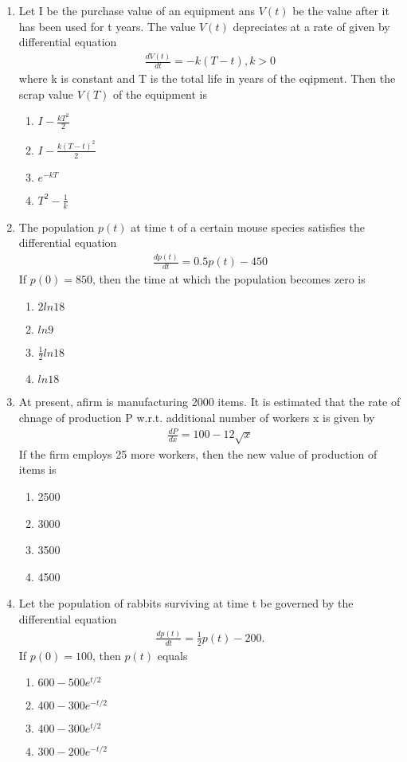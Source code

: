 \begin{enumerate}[label=\arabic*.,ref=\thesubsection.\theenumi]
\item Let I be the purchase value of an equipment ans $V(t)$ be the value after it has been used for t years. The value 
$V(t)$ depreciates at a rate of given by differential equation 
\begin{align*}
\frac{dV(t)}{dt} = -k(T - t), k > 0
\end{align*}
where k is constant and T is the total life in years of the eqipment. Then the scrap value $V(T)$ of the equipment is
\begin{enumerate}
\item $I - \frac{kT^2}{2}$
\item $I - \frac{k(T - t)^2}{2}$
\item $e^{-kT}$
\item $T^2 - \frac{1}{k}$
\end{enumerate} 

\item The population $p(t)$ at time t of a certain mouse species satisfies the differential equation
\begin{align*}
\frac{dp(t)}{dt} = 0.5p(t) - 450
\end{align*}
If $p(0) = 850$, then the time at which the population becomes zero is
\begin{enumerate}
\item $2ln18$
\item $ln9$
\item $\frac{1}{2}ln18$
\item $ln18$
\end{enumerate}

\item At present, afirm is manufacturing 2000 items. It is estimated that the rate of chnage of production P w.r.t. additional number of workers x is given by
\begin{align*}
\frac{dP}{dx} = 100  - 12\sqrt{x}
\end{align*}
If the firm employs 25 more workers, then the new value of production of items is
\begin{enumerate}
\item 2500
\item 3000
\item 3500
\item 4500
\end{enumerate}

\item Let the population of rabbits surviving at time t be governed by the differential equation
\begin{align*}
\frac{dp(t)}{dt} = \frac{1}{2}p(t) - 200.
\end{align*}
If $p(0) = 100$, then $p(t)$ equals
\begin{enumerate}
\item $600 - 500e^{t/2}$
\item $400 - 300e^{-t/2}$
\item $400 - 300e^{t/2}$
\item $300 - 200e^{-t/2}$
\end{enumerate}


\end{enumerate}
